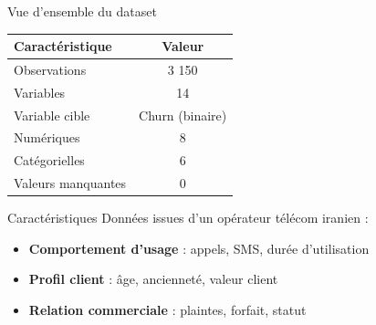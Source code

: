 \documentclass[
  10pt,
  ignorenonframetext,
  aspectratio=169,
]{beamer}
\providecommand{\tightlist}{%
  \setlength{\itemsep}{0pt}\setlength{\parskip}{0pt}}\usepackage{longtable,booktabs,array}
\begin{document}
\begin{frame}{Vue d'ensemble du dataset}
\label{vue-densemble-du-dataset}
\begingroup\fontsize{9}{11}\selectfont

\begin{longtable*}[t]{lc}
\toprule
Caractéristique & Valeur\\
\midrule
Observations & 3 150\\
Variables & 14\\
Variable cible & Churn (binaire)\\
Numériques & 8\\
Catégorielles & 6\\
\addlinespace
Valeurs manquantes & 0\\
\bottomrule
\end{longtable*}
\endgroup{}

\begin{block}{Caractéristiques}
\label{caractuxe9ristiques}
Données issues d'un opérateur télécom iranien :

\begin{itemize}
\tightlist
\item
  \textbf{Comportement d'usage} : appels, SMS, durée d'utilisation
\item
  \textbf{Profil client} : âge, ancienneté, valeur client
\item
  \textbf{Relation commerciale} : plaintes, forfait, statut
\end{itemize}
\end{block}
\end{frame}
\end{document}
